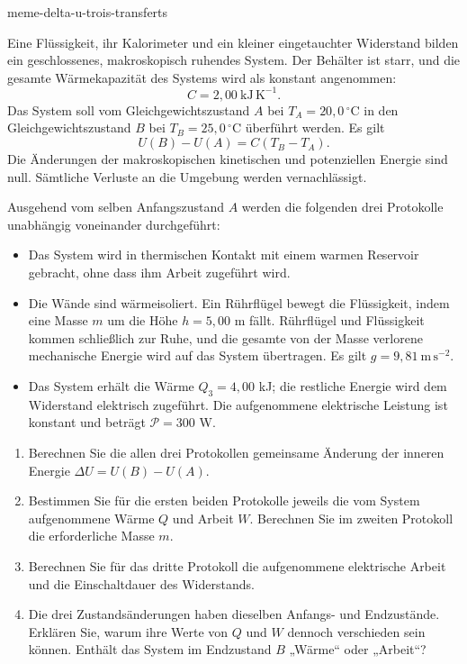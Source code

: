 \begin{exo}{meme-delta-u-trois-transferts}

Eine Flüssigkeit, ihr Kalorimeter und ein kleiner eingetauchter Widerstand
bilden ein geschlossenes, makroskopisch ruhendes System. Der Behälter ist
starr, und die gesamte Wärmekapazität des Systems wird als konstant angenommen:
\[
C=2{,}00\ \mathrm{kJ\,K^{-1}}.
\]
Das System soll vom Gleichgewichtszustand $A$ bei
$T_A=20{,}0\,^\circ\mathrm{C}$ in den Gleichgewichtszustand $B$ bei
$T_B=25{,}0\,^\circ\mathrm{C}$ überführt werden. Es gilt
\[
U(B)-U(A)=C(T_B-T_A).
\]
Die Änderungen der makroskopischen kinetischen und potenziellen Energie sind
null. Sämtliche Verluste an die Umgebung werden vernachlässigt.

Ausgehend vom selben Anfangszustand $A$ werden die folgenden drei Protokolle
unabhängig voneinander durchgeführt:
\begin{itemize}
\item[Protokoll 1] Das System wird in thermischen Kontakt mit einem warmen Reservoir gebracht, ohne dass ihm Arbeit zugeführt wird.
\item[Protokoll 2] Die Wände sind wärmeisoliert. Ein Rührflügel bewegt die Flüssigkeit, indem eine Masse $m$ um die Höhe $h=5{,}00$ m fällt. Rührflügel und Flüssigkeit kommen schließlich zur Ruhe, und die gesamte von der Masse verlorene mechanische Energie wird auf das System übertragen. Es gilt $g=9{,}81\ \mathrm{m\,s^{-2}}$.
\item[Protokoll 3] Das System erhält die Wärme $Q_3=4{,}00$ kJ; die restliche Energie wird dem Widerstand elektrisch zugeführt. Die aufgenommene elektrische Leistung ist konstant und beträgt $\mathcal P=300$ W.
\end{itemize}

\begin{enumerate}
\item Berechnen Sie die allen drei Protokollen gemeinsame Änderung der inneren Energie $\Delta U=U(B)-U(A)$.
\item Bestimmen Sie für die ersten beiden Protokolle jeweils die vom System aufgenommene Wärme $Q$ und Arbeit $W$. Berechnen Sie im zweiten Protokoll die erforderliche Masse $m$.
\item Berechnen Sie für das dritte Protokoll die aufgenommene elektrische Arbeit und die Einschaltdauer des Widerstands.
\item Die drei Zustandsänderungen haben dieselben Anfangs- und Endzustände. Erklären Sie, warum ihre Werte von $Q$ und $W$ dennoch verschieden sein können. Enthält das System im Endzustand $B$ „Wärme“ oder „Arbeit“?
\end{enumerate}


\end{exo}
